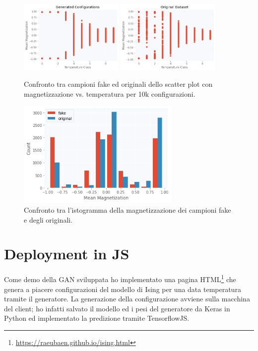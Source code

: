 \documentclass[a4paper]{article}
\begin{document}
\begin{figure}[H]
\includegraphics[width=0.45\textwidth]{fakescatter.png}
\includegraphics[width=0.45\textwidth]{origscatter.png}
\centering
\caption{Confronto tra campioni fake ed originali dello scatter plot con magnetizzazione vs. temperatura per 10k configurazioni.}
\end{figure}
\begin{figure}[H]
\includegraphics[width=0.7\textwidth]{hist.png}
\centering
\caption{Confronto tra l'istogramma della magnetizzazione dei campioni fake e degli originali.}
\end{figure}
\section{Deployment in JS}
Come demo della GAN sviluppata ho implementato una pagina HTML\footnote{\url{https://raeubaen.github.io/ising.html}} che genera a piacere configurazioni del modello di Ising per una data temperatura tramite il generatore. La generazione della configurazione avviene sulla macchina del client; ho infatti salvato il modello ed i pesi del generatore da Keras in Python ed implementato la predizione tramite TensorflowJS. 
\newpage
\nocite{reference}
{}

\end{document}
